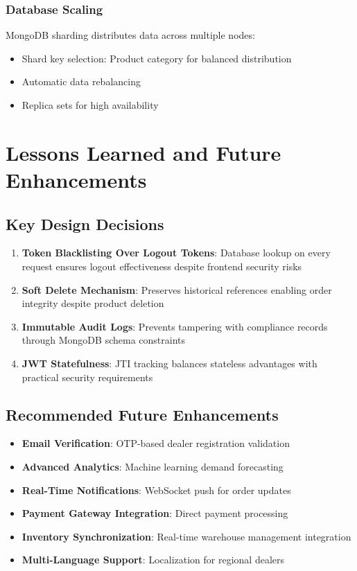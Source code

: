 \documentclass[conference]{IEEEtran}
\begin{document}
\subsubsection{Database Scaling}
MongoDB sharding distributes data across multiple nodes:
\begin{itemize}
\item Shard key selection: Product category for balanced distribution
\item Automatic data rebalancing
\item Replica sets for high availability
\end{itemize}

\section{Lessons Learned and Future Enhancements}

\subsection{Key Design Decisions}

\begin{enumerate}
\item \textbf{Token Blacklisting Over Logout Tokens}: Database lookup on every request ensures logout effectiveness despite frontend security risks
\item \textbf{Soft Delete Mechanism}: Preserves historical references enabling order integrity despite product deletion
\item \textbf{Immutable Audit Logs}: Prevents tampering with compliance records through MongoDB schema constraints
\item \textbf{JWT Statefulness}: JTI tracking balances stateless advantages with practical security requirements
\end{enumerate}

\subsection{Recommended Future Enhancements}

\begin{itemize}
\item \textbf{Email Verification}: OTP-based dealer registration validation
\item \textbf{Advanced Analytics}: Machine learning demand forecasting
\item \textbf{Real-Time Notifications}: WebSocket push for order updates
\item \textbf{Payment Gateway Integration}: Direct payment processing
\item \textbf{Inventory Synchronization}: Real-time warehouse management integration
\item \textbf{Multi-Language Support}: Localization for regional dealers
\end{itemize}
\end{document}
